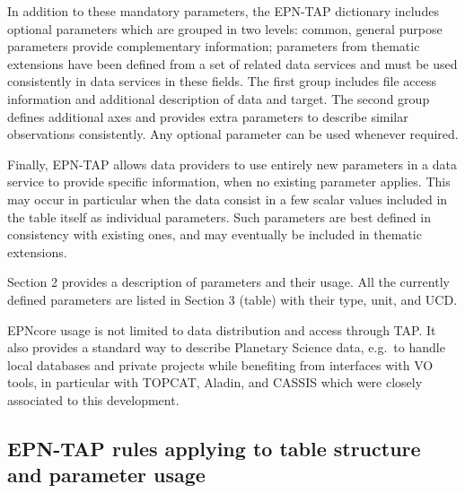 \documentclass[11pt,a4paper]{ivoa}
\begin{document}
In addition to these mandatory parameters, the EPN-TAP dictionary includes
optional parameters which are grouped in two levels: common, general
purpose parameters provide complementary information; parameters from
thematic extensions have been defined from a set of related data services
and must be used consistently in data services in these fields. The first
group includes file access information and additional description of data
and target. The second group defines additional axes and provides extra
parameters to describe similar observations consistently. Any optional
parameter can be used whenever required.

Finally, EPN-TAP allows data providers to use entirely new parameters in a
data service to provide specific information, when no existing parameter
applies. This may occur in particular when the data consist in a few
scalar values included in the table itself as individual parameters. Such
parameters are best defined in consistency with existing ones, and may
eventually be included in thematic extensions.

Section 2 provides a description of parameters and their usage. All the
currently defined parameters are listed in Section 3 (table) with their
type, unit, and UCD.

EPNcore usage is not limited to data distribution and access through
TAP. It also provides a standard way to describe Planetary Science data,
e.g.\ to handle local databases and private projects while benefiting
from interfaces with VO tools, in particular with TOPCAT, Aladin, and
CASSIS which were closely associated to this development.

\subsection{EPN-TAP rules applying to table structure and parameter usage}
\end{document}
